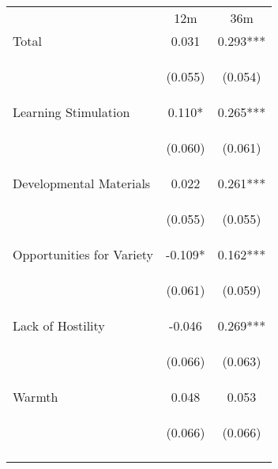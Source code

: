 \begin{tabular}{lcc}
\hline \noalign{\smallskip} & 12m & 36m\\
\noalign{\smallskip}\hline \noalign{\smallskip}Total & 0.031 & 0.293***\\
 & \begin{footnotesize}(0.055)\end{footnotesize} & \begin{footnotesize}(0.054)\end{footnotesize}\\
\noalign{\smallskip}Learning Stimulation & 0.110* & 0.265***\\
 & \begin{footnotesize}(0.060)\end{footnotesize} & \begin{footnotesize}(0.061)\end{footnotesize}\\
\noalign{\smallskip}Developmental Materials & 0.022 & 0.261***\\
 & \begin{footnotesize}(0.055)\end{footnotesize} & \begin{footnotesize}(0.055)\end{footnotesize}\\
\noalign{\smallskip}Opportunities for Variety & -0.109* & 0.162***\\
 & \begin{footnotesize}(0.061)\end{footnotesize} & \begin{footnotesize}(0.059)\end{footnotesize}\\
\noalign{\smallskip}Lack of Hostility & -0.046 & 0.269***\\
 & \begin{footnotesize}(0.066)\end{footnotesize} & \begin{footnotesize}(0.063)\end{footnotesize}\\
\noalign{\smallskip}Warmth & 0.048 & 0.053\\
 & \begin{footnotesize}(0.066)\end{footnotesize} & \begin{footnotesize}(0.066)\end{footnotesize}\\
\noalign{\smallskip}\hline\end{tabular}\\
